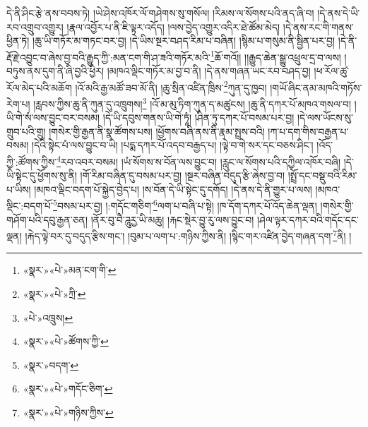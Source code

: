 དེ་ནི་ཤིང་རྩེ་ནས་བབས་ཏེ། །ཡེ་ཤེས་འཁོར་ལོ་གཤེགས་སུ་གསོལ། །རིམས་ལ་སོགས་པའི་ནད་ཞི་བ། །དེ་ནས་དེ་ཡི་རབ་འགྲུབ་འགྱུར། །རྣལ་འབྱོར་པ་ནི་ཇི་ལྟར་འདོད། །ལས་བྱེད་འགྱུར་འདིར་ཐེ་ཚོམ་མེད། །དེ་ནས་རང་གི་གནས་ཕྱིན་ཏེ། །ཆུ་ཡི་གཏོར་མ་གཏང་བར་བྱ། །དེ་ཡིས་སྔར་བཤད་རིམ་པ་བཞིན། །སྙིམ་པ་གསུམ་ནི་སྦྱིན་པར་བྱ། །དེ་ནི་རྡོ་རྗེ་འབྱུང་བ་ཞེས་བྱ་བའི་རྒྱུད་ཀྱི་:མན་ངག་གི་ཤ་ཟའི་གཏོར་མའི་\footnote{«སྣར་»«པེ་»མན་ངག་གི་}ཆོ་གའོ།། །།རྒྱུད་ཆེན་སྒྱུ་འཕྲུལ་དྲ་བ་ལས། །བཏུས་ནས་དུག་ནི་ཞི་བྱའི་ཕྱིར། །མཁའ་ལྡིང་གཏོར་མ་བྱ་བ་ནི། །དེ་ནས་གཞན་ཡང་རབ་བཤད་བྱ། །ཕ་རོལ་ཚུ་རོལ་མེད་པའི་མཆོག །འོ་མའི་རྒྱ་མཚོ་ཟབ་མོ་ནི། །ཆུ་སྲིན་འཛིན་ཁྲིས་\footnote{«སྣར་»«པེ་»ཀྲི་}ཀུན་དུ་ཁྱབ། །གཡོ་ཞིང་ནམ་མཁའི་གཏོས་རེག་པ། །རླབས་ཀྱིས་ཆུ་ནི་ཀུན་དུ་འཁྲུགས།\footnote{«པེ་»འཁྲུས།} །འོ་མ་མུ་ཏིག་ཀུན་ད་མཚུངས། །ཆུ་ནི་དཀར་པོ་མཁའ་གསལ་བ། །ཡི་གེ་སཾ་ལས་བྱུང་བར་བསམ། །དེ་ཡི་དབུས་གནས་ཡི་གེ་ཏཱཾ། །ཤིན་ཏུ་དཀར་པོ་བསམ་པར་བྱ། །དེ་ལས་ཡོངས་སུ་གྲུབ་པའི་གྲུ། །གསེར་གྱི་རྒྱན་ནི་སྣ་ཚོགས་པས། །ཕྱོགས་བཞི་ནས་ནི་རྣམ་སྤྲས་བའི། །ཀ་པ་དག་གིས་བརྒྱན་པ་བསམ། །དེའི་སྟེང་པཾ་ལས་བྱུང་བ་ཡི། །པདྨ་དཀར་པོ་འདབ་བརྒྱད་པ། །ལྟེ་བ་གེ་སར་དང་བཅས་ཤིང་། །འོད་ཀྱི་:ཚོགས་ཀྱིས་\footnote{«སྣར་»«པེ་»ཚོགས་ཀྱི་}རབ་འབར་བསམ། །ཡཾ་སོགས་ས་བོན་ལས་བྱུང་བ། །རླུང་ལ་སོགས་པའི་དཀྱིལ་འཁོར་བཞི། །དེ་ཡི་སྟེང་དུ་ཕྱོགས་སུ་ནི། །གོ་རིམ་བཞིན་དུ་བསམ་པར་བྱ། །སྔར་བཞིན་བདུད་རྩི་ཞེས་བྱ་བ། །སྤྲོ་དང་བསྡུ་བའི་རིམ་པ་ཡིས། །མཁའ་ལྡིང་བདག་པོ་སྐྱེད་བྱེད་པ། །ས་བོན་དེ་ཡི་སྟེང་དུ་དགོད། །དེ་ནས་དེ་ནི་གྱུར་པ་ལས། །མཁའ་ལྡིང་:བདག་པོ་\footnote{«སྣར་»བདག་}བསམ་པར་བྱ། །:གདོང་གཅིག་\footnote{«སྣར་»«པེ་»གདོང་ཅིག་}ལག་པ་བཞི་པ་སྟེ། །ཁ་དོག་དཀར་པོ་འོད་ཆེན་ལྡན། །གསེར་གྱི་གཤོག་པའི་དབུ་རྒྱན་ཅན། །ནོར་བུ་བཻ་ཌཱུརྱ་ཡི་མཆུ། །རྐང་སྡེར་བྱུ་རུ་ལས་བྱུང་བ། །ཤེལ་ལྟར་དཀར་བའི་གདོང་དང་ལྡན། །རྐེད་ལྟེ་བར་དུ་བདུད་རྩིས་གང་། །བུམ་པ་ལག་པ་:གཉིས་ཀྱིས་ནི། །སྙིང་གར་འཛིན་བྱེད་གཞན་དག་\footnote{«སྣར་»«པེ་»གཉིས་ཀྱིས་}ནི། །
